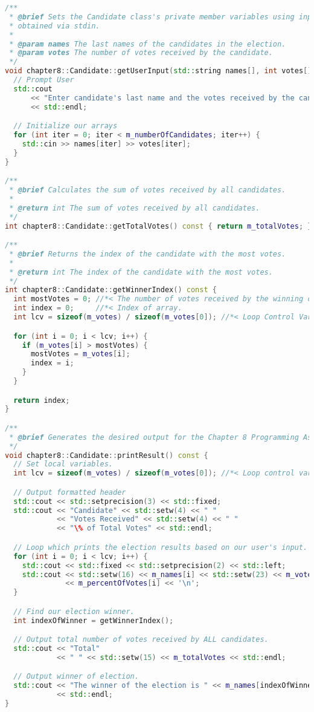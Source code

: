\documentclass[12pt]{report}
\theoremstyle{definition}
\theoremstyle{plain}
\theoremstyle{plain}
\begin{document}
\begin{lstlisting}[language=c++,caption={Ashton`s clang-format Result -- Macros}]
/**
 * @brief Sets the Candidate class's private member variables using input
 * obtained via stdin.
 *
 * @param names The last names of the candidates in the election.
 * @param votes The number of votes received by the candidate.
 */
void chapter8::Candidate::getUserInput(std::string names[], int votes[]) {
  // Prompt User
  std::cout
      << "Enter candidate's last name and the votes received by the candidate."
      << std::endl;

  // Initialize our arrays
  for (int iter = 0; iter < m_numberOfCandidates; iter++) {
    std::cin >> names[iter] >> votes[iter];
  }
}

/**
 * @brief Calculates the sum of votes received by all candidates.
 *
 * @return int The sum of votes received by all candidates.
 */
int chapter8::Candidate::getTotalVotes() const { return m_totalVotes; }

/**
 * @brief Returns the index of the candidate with the most votes.
 *
 * @return int The index of the candidate with the most votes.
 */
int chapter8::Candidate::getWinnerIndex() const {
  int mostVotes = 0; //*< The number of votes received by the winning candidate.
  int index = 0;     //*< Index of array.
  int lcv = sizeof(m_votes) / sizeof(m_votes[0]); //*< Loop Control Variable.

  for (int i = 0; i < lcv; i++) {
    if (m_votes[i] > mostVotes) {
      mostVotes = m_votes[i];
      index = i;
    }
  }

  return index;
}

/**
 * @brief Generates the desired output for the Chapter 8 Programming Assignment.
 */
void chapter8::Candidate::printResult() const {
  // Set local variables.
  int lcv = sizeof(m_votes) / sizeof(m_votes[0]); //*< Loop control variable.

  // Output formatted header
  std::cout << std::setprecision(3) << std::fixed;
  std::cout << "Candidate" << std::setw(4) << " "
            << "Votes Received" << std::setw(4) << " "
            << "\% of Total Votes" << std::endl;

  // Loop which prints the election results based on our user's input.
  for (int i = 0; i < lcv; i++) {
    std::cout << std::fixed << std::setprecision(2) << std::left;
    std::cout << std::setw(16) << m_names[i] << std::setw(23) << m_votes[i]
              << m_percentOfVotes[i] << '\n';
  }

  // Find our election winner.
  int indexOfWinner = getWinnerIndex();

  // Output total number of votes received by ALL candidates.
  std::cout << "Total"
            << " " << std::setw(15) << m_totalVotes << std::endl;

  // Output winner of election.
  std::cout << "The winner of the election is " << m_names[indexOfWinner] << "."
            << std::endl;
}
\end{lstlisting}
          
\end{document}
